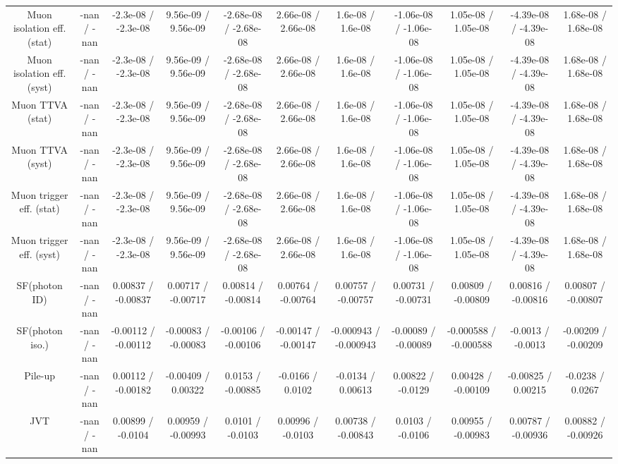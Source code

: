 \begin{table}[htbp]
\begin{center}
\begin{tabular}{|c|c|c|c|c|c|c|c|c|c|c|}
  Muon isolation eff. (stat) & -nan / -nan & -2.3e-08 / -2.3e-08 & 9.56e-09 / 9.56e-09 & -2.68e-08 / -2.68e-08 & 2.66e-08 / 2.66e-08 & 1.6e-08 / 1.6e-08 & -1.06e-08 / -1.06e-08 & 1.05e-08 / 1.05e-08 & -4.39e-08 / -4.39e-08 & 1.68e-08 / 1.68e-08 \\ 
  Muon isolation eff. (syst) & -nan / -nan & -2.3e-08 / -2.3e-08 & 9.56e-09 / 9.56e-09 & -2.68e-08 / -2.68e-08 & 2.66e-08 / 2.66e-08 & 1.6e-08 / 1.6e-08 & -1.06e-08 / -1.06e-08 & 1.05e-08 / 1.05e-08 & -4.39e-08 / -4.39e-08 & 1.68e-08 / 1.68e-08 \\ 
  Muon TTVA (stat) & -nan / -nan & -2.3e-08 / -2.3e-08 & 9.56e-09 / 9.56e-09 & -2.68e-08 / -2.68e-08 & 2.66e-08 / 2.66e-08 & 1.6e-08 / 1.6e-08 & -1.06e-08 / -1.06e-08 & 1.05e-08 / 1.05e-08 & -4.39e-08 / -4.39e-08 & 1.68e-08 / 1.68e-08 \\ 
  Muon TTVA (syst) & -nan / -nan & -2.3e-08 / -2.3e-08 & 9.56e-09 / 9.56e-09 & -2.68e-08 / -2.68e-08 & 2.66e-08 / 2.66e-08 & 1.6e-08 / 1.6e-08 & -1.06e-08 / -1.06e-08 & 1.05e-08 / 1.05e-08 & -4.39e-08 / -4.39e-08 & 1.68e-08 / 1.68e-08 \\ 
  Muon trigger eff. (stat) & -nan / -nan & -2.3e-08 / -2.3e-08 & 9.56e-09 / 9.56e-09 & -2.68e-08 / -2.68e-08 & 2.66e-08 / 2.66e-08 & 1.6e-08 / 1.6e-08 & -1.06e-08 / -1.06e-08 & 1.05e-08 / 1.05e-08 & -4.39e-08 / -4.39e-08 & 1.68e-08 / 1.68e-08 \\ 
  Muon trigger eff. (syst) & -nan / -nan & -2.3e-08 / -2.3e-08 & 9.56e-09 / 9.56e-09 & -2.68e-08 / -2.68e-08 & 2.66e-08 / 2.66e-08 & 1.6e-08 / 1.6e-08 & -1.06e-08 / -1.06e-08 & 1.05e-08 / 1.05e-08 & -4.39e-08 / -4.39e-08 & 1.68e-08 / 1.68e-08 \\ 
  SF(photon ID) & -nan / -nan & 0.00837 / -0.00837 & 0.00717 / -0.00717 & 0.00814 / -0.00814 & 0.00764 / -0.00764 & 0.00757 / -0.00757 & 0.00731 / -0.00731 & 0.00809 / -0.00809 & 0.00816 / -0.00816 & 0.00807 / -0.00807 \\ 
  SF(photon iso.) & -nan / -nan & -0.00112 / -0.00112 & -0.00083 / -0.00083 & -0.00106 / -0.00106 & -0.00147 / -0.00147 & -0.000943 / -0.000943 & -0.00089 / -0.00089 & -0.000588 / -0.000588 & -0.0013 / -0.0013 & -0.00209 / -0.00209 \\ 
  Pile-up & -nan / -nan & 0.00112 / -0.00182 & -0.00409 / 0.00322 & 0.0153 / -0.00885 & -0.0166 / 0.0102 & -0.0134 / 0.00613 & 0.00822 / -0.0129 & 0.00428 / -0.00109 & -0.00825 / 0.00215 & -0.0238 / 0.0267 \\ 
  JVT & -nan / -nan & 0.00899 / -0.0104 & 0.00959 / -0.00993 & 0.0101 / -0.0103 & 0.00996 / -0.0103 & 0.00738 / -0.00843 & 0.0103 / -0.0106 & 0.00955 / -0.00983 & 0.00787 / -0.00936 & 0.00882 / -0.00926 \\ 

\end{tabular}
\end{center}
\end{table}
